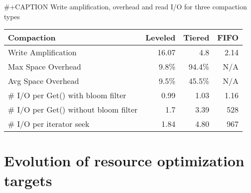 \documentclass[11pt]{article}
\begin{document}
\#+CAPTION Write amplification, overhead and read I/O for three compaction types
\begin{center}
\begin{tabular}{lrrr}
\hline
Compaction & Leveled & Tiered & FIFO\\
\hline
Write Amplification & 16.07 & 4.8 & 2.14\\
Max Space Overhead & 9.8\% & 94.4\% & N/A\\
Avg Space Overhead & 9.5\% & 45.5\% & N/A\\
\# I/O per Get() with bloom filter & 0.99 & 1.03 & 1.16\\
\# I/O per Get() without bloom filter & 1.7 & 3.39 & 528\\
\# I/O per iterator seek & 1.84 & 4.80 & 967\\
\hline
\end{tabular}
\end{center}
\section{Evolution of resource optimization targets}
\label{sec:org82299e6}
\end{document}
